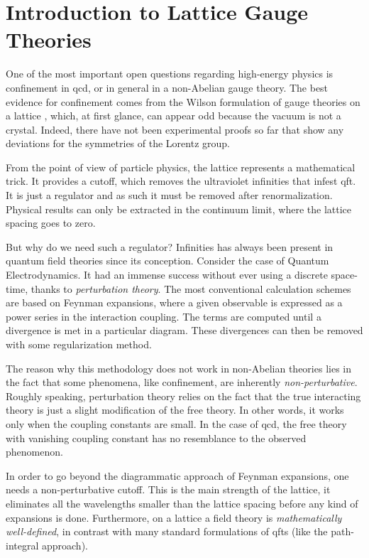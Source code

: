 \chapter{Introduction to Lattice Gauge Theories}
\label{chap:introduction_to_lattice_gauge_theories}

One of the most important open questions regarding high-energy physics is confinement in \ac{qcd}, or in general in a non-Abelian gauge theory.
The best evidence for confinement comes from the Wilson formulation of gauge theories on a lattice \cite{wilson1974confinement}, which, at first glance, can appear odd because the vacuum is not a crystal.
Indeed, there have not been experimental proofs so far that show any deviations for the symmetries of the Lorentz group.

From the point of view of particle physics, the lattice represents a mathematical trick.
It provides a cutoff, which removes the ultraviolet infinities that infest \ac{qft}.
It is just a regulator and as such it must be removed after renormalization.
Physical results can only be extracted in the continuum limit, where the lattice spacing goes to zero.

But why do we need such a regulator?
Infinities has always been present in quantum field theories since its conception.
Consider the case of Quantum Electrodynamics.
It had an immense success without ever using a discrete space-time, thanks to \emph{perturbation theory}.
The most conventional calculation schemes are based on Feynman expansions,
where a given observable is expressed as a power series in the interaction coupling.
The terms are computed until a divergence is met in a particular diagram.
These divergences can then be removed with some regularization method.

The reason why this methodology does not work in non-Abelian theories lies in the fact that some phenomena, like confinement, are inherently \emph{non-perturbative}.
Roughly speaking, perturbation theory relies on the fact that the true interacting theory is just a slight modification of the free theory.
In other words, it works only when the coupling constants are small.
In the case of \ac{qcd}, the free theory with vanishing coupling constant has no resemblance to the observed phenomenon.

In order to go beyond the diagrammatic approach of Feynman expansions, one needs a non-perturbative cutoff.
This is the main strength of the lattice, it eliminates all the wavelengths smaller than the lattice spacing before any kind of expansions is done.
Furthermore, on a lattice a field theory is \emph{mathematically well-defined}, in contrast with many standard formulations of \ac{qft}s (like the path-integral approach).

